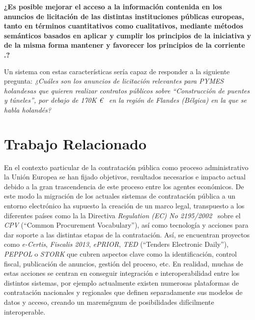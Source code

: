 \documentclass[a4paper,final,11pt,fleqn,twoside]{book}  %
\begin{document}
\textbf{¿Es posible mejorar el acceso a la información contenida en los anuncios de licitación de 
las distintas instituciones públicas europeas, tanto en términos cuantitativos como cualitativos, mediante métodos semánticos basados 
en aplicar y cumplir los principios de la iniciativa \linkeddata y de la misma forma mantener y favorecer
los principios de la corriente \opendata.?}

Un sistema con estas características sería capaz de responder a la siguiente pregunta: \textit{¿Cuáles 
son los anuncios de licitación relevantes para PYMES holandesas que quieren realizar contratos 
públicos sobre ``Construcción de puentes y túneles'', por debajo de 170K \euro\mbox{ } en la región 
de Flandes (Bélgica) en la que se habla holandés?}

\chapter{Trabajo Relacionado}
En el contexto particular de la contratación pública como proceso administrativo la Unión Europea se han fijado objetivos, 
resultados necesarios e impacto actual~\cite{siemensEval,euEval} debido a la gran trascendencia de este proceso 
entre los agentes económicos. De este modo la migración de los actuales sistemas de contratación pública a un entorno 
electrónico ha supuesto la creación de un marco legal, transpuesto a los diferentes países como la 
la Directiva \textit{Regulation (EC) No 2195/2002}~\cite{r2195} sobre el \textit{CPV} (``Common Procurement Vocabulary''), así como tecnología y 
acciones para dar soporte a las distintas etapas de la contratación. Así, se encuentran proyectos 
como \textit{e-Certis}, \textit{Fiscalis 2013}, \textit{ePRIOR}, \textit{TED} (``Tenders Electronic Daily''), \textit{PEPPOL} o \textit{STORK} que cubren 
aspectos clave como la identificación, control fiscal, publicación de anuncios, gestión del proceso, etc. En realidad, muchas 
de estas acciones se centran en conseguir integración e interoperabilidad entre los distintos sistemas, por ejemplo actualmente 
existen numerosas plataformas de contratación nacionales y regionales que definen separadamente sus modelos de datos y acceso, 
creando un maremégnum de posibilidades difícilmente interoperable.
\end{document}
